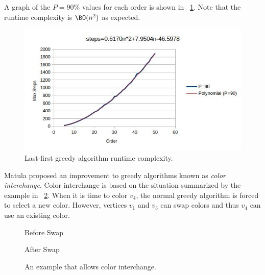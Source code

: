 A graph of the \(P=90\%\) values for each order is shown in \figurename~\ref{fig:greedy:runtime}.  Note that the
runtime complexity is \(\BO(n^2)\) as expected.

\begin{figure}[H]
  \centering
  \includegraphics[width=5in]{greedy_runtime}
  \caption{Last-first greedy algorithm runtime complexity.}
  \label{fig:greedy:runtime}
\end{figure}

Matula proposed an improvement to greedy algorithms known as \emph{color interchange}.  Color interchange is based
on the situation summarized by the example in \figurename~\ref{fig:interchange}.  When it is time to color \(v_4\),
the normal greedy algorithm is forced to select a new color.  However, vertices \(v_1\) and \(v_3\) can swap colors
and thus \(v_4\) can use an existing color.

\begin{figure}[H]
  \begin{minipage}{2.5in}
    \centering

    Before Swap
  \end{minipage}
  \begin{minipage}{2.5in}
    \centering

    After Swap
  \end{minipage}
  \caption{An example that allows color interchange.}
  \label{fig:interchange}
\end{figure}

